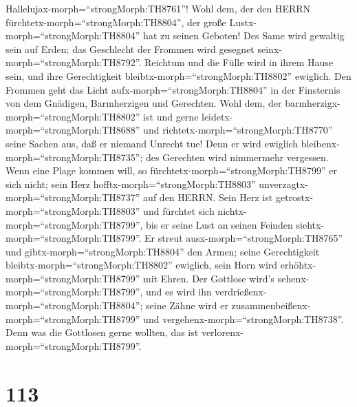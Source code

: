  Hallelujax-morph=``strongMorph:TH8761''! Wohl dem, der den
HERRN fürchtetx-morph=``strongMorph:TH8804'', der große
Lustx-morph=``strongMorph:TH8804'' hat zu seinen Geboten! 
Des Same wird gewaltig sein auf Erden; das Geschlecht der Frommen wird
gesegnet seinx-morph=``strongMorph:TH8792''.  Reichtum und
die Fülle wird in ihrem Hause sein, und ihre Gerechtigkeit
bleibtx-morph=``strongMorph:TH8802'' ewiglich.  Den Frommen
geht das Licht aufx-morph=``strongMorph:TH8804'' in der Finsternis von
dem Gnädigen, Barmherzigen und Gerechten.  Wohl dem, der
barmherzigx-morph=``strongMorph:TH8802'' ist und gerne
leidetx-morph=``strongMorph:TH8688'' und
richtetx-morph=``strongMorph:TH8770'' seine Sachen aus, daß er niemand
Unrecht tue!  Denn er wird ewiglich
bleibenx-morph=``strongMorph:TH8735''; des Gerechten wird nimmermehr
vergessen.  Wenn eine Plage kommen will, so
fürchtetx-morph=``strongMorph:TH8799'' er sich nicht; sein Herz
hofftx-morph=``strongMorph:TH8803''
unverzagtx-morph=``strongMorph:TH8737'' auf den HERRN.  Sein
Herz ist getrostx-morph=``strongMorph:TH8803'' und fürchtet sich
nichtx-morph=``strongMorph:TH8799'', bis er seine Lust an seinen Feinden
siehtx-morph=``strongMorph:TH8799''.  Er streut
ausx-morph=``strongMorph:TH8765'' und gibtx-morph=``strongMorph:TH8804''
den Armen; seine Gerechtigkeit bleibtx-morph=``strongMorph:TH8802''
ewiglich, sein Horn wird erhöhtx-morph=``strongMorph:TH8799'' mit Ehren.
 Der Gottlose wird's sehenx-morph=``strongMorph:TH8799'',
und es wird ihn verdrießenx-morph=``strongMorph:TH8804''; seine Zähne
wird er zusammenbeißenx-morph=``strongMorph:TH8799'' und
vergehenx-morph=``strongMorph:TH8738''. Denn was die Gottlosen gerne
wollten, das ist verlorenx-morph=``strongMorph:TH8799''.

\hypertarget{section-112}{%
\section{113}\label{section-112}}

